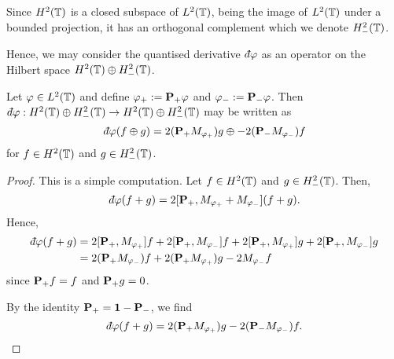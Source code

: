 Since $H^2(\mathbb{T})$
is a closed subspace of $L^2(\mathbb{T})$, being the image of $L^2(\mathbb{T})$
under a bounded projection, it has an orthogonal complement which we denote $H^2_-(\mathbb{T})$.

Hence, we may consider the quantised derivative $\qd\varphi$ as an operator on
the Hilbert space $H^2(\mathbb{T})\oplus H^2_-(\mathbb{T})$.

\begin{lemma}
    Let $\varphi \in L^2(\mathbb{T})$ and define $\varphi_+ := \mathbf{P}_+ \varphi$ and $\varphi_- := \mathbf{P}_- \varphi$. Then $\qd\varphi:H^2(\Circ)\oplus H^2_-(\Circ)\rightarrow H^2(\Circ)\oplus H^2_-(\Circ)$ may be written as
    \begin{equation}
        \qd\varphi(f\oplus g) = 
            2(\Proj_+M_{\varphi_+})g \oplus
            -2(\Proj_-M_{\varphi_-})f
    \end{equation}
    for $f \in H^2(\mathbb{T})$ and $g \in H^2_-(\mathbb{T})$.
\end{lemma}
\begin{proof}
    This is a simple computation. Let $f \in H^2(\mathbb{T})$ and $g \in H^2_-(\mathbb{T})$. Then,
    \begin{equation}
        \qd\varphi(f+g) = 2[\Proj_+,M_{\varphi_+}+M_{\varphi_-}](f+g).
    \end{equation}
    Hence,
    \begin{align*}
        \qd\varphi(f+g) &= 2[\Proj_+,M_{\varphi_+}]f + 2[\Proj_+,M_{\varphi_-}]f + 2[\Proj_+,M_{\varphi_+}]g + 2[\Proj_+,M_{\varphi_-}]g\\
        &= 2(\Proj_+M_{\varphi_-})f+2(\Proj_+M_{\varphi_+})g-2M_{\varphi_-}f
    \end{align*}
    since $\mathbf{P}_+f = f$ and $\mathbf{P}_+g = 0$.
    
    By the identity $\mathbf{P}_+ = \mathbf{1}-\mathbf{P}_-$, we find
    \begin{equation}
        \qd\varphi(f+g) = 2(\Proj_+M_{\varphi_+})g - 2(\Proj_-M_{\varphi_-})f.
    \end{equation}
\end{proof}


